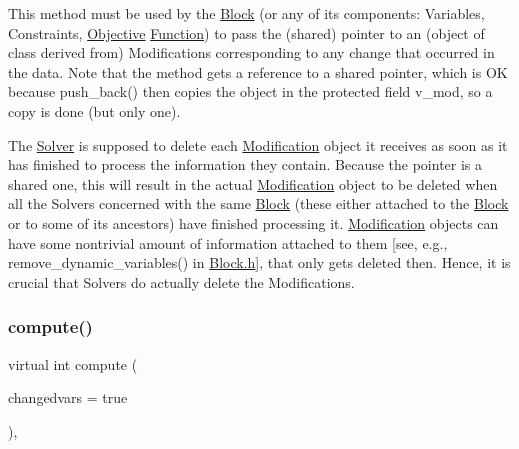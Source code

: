 This method must be used by the \mbox{\hyperlink{class_s_m_spp__di__unipi__it_1_1_block}{Block}} (or any of its components\+: Variables, Constraints, \mbox{\hyperlink{class_s_m_spp__di__unipi__it_1_1_objective}{Objective}} \mbox{\hyperlink{class_s_m_spp__di__unipi__it_1_1_function}{Function}}) to pass the (shared) pointer to an (object of class derived from) Modifications corresponding to any change that occurred in the data. Note that the method gets a reference to a shared pointer, which is OK because push\+\_\+back() then copies the object in the protected field v\+\_\+mod, so a copy is done (but only one).

The \mbox{\hyperlink{class_s_m_spp__di__unipi__it_1_1_solver}{Solver}} is supposed to delete each \mbox{\hyperlink{class_s_m_spp__di__unipi__it_1_1_modification}{Modification}} object it receives as soon as it has finished to process the information they contain. Because the pointer is a shared one, this will result in the actual \mbox{\hyperlink{class_s_m_spp__di__unipi__it_1_1_modification}{Modification}} object to be deleted when all the Solvers concerned with the same \mbox{\hyperlink{class_s_m_spp__di__unipi__it_1_1_block}{Block}} (these either attached to the \mbox{\hyperlink{class_s_m_spp__di__unipi__it_1_1_block}{Block}} or to some of its ancestors) have finished processing it. \mbox{\hyperlink{class_s_m_spp__di__unipi__it_1_1_modification}{Modification}} objects can have some nontrivial amount of information attached to them \mbox{[}see, e.\+g., remove\+\_\+dynamic\+\_\+variables() in \mbox{\hyperlink{_block_8h}{Block.\+h}}\mbox{]}, that only gets deleted then. Hence, it is crucial that Solvers do actually delete the Modifications. \mbox{\label{class_s_m_spp__di__unipi__it_1_1_solver_a504d4e3e174c7a518cc66156a8a45ce5}} 
\subsubsection{\texorpdfstring{compute()}{compute()}}
{\footnotesize\ttfamily virtual int compute (\begin{DoxyParamCaption}\item[{bool}]{changedvars = {\ttfamily true} }\end{DoxyParamCaption})\hspace{0.3cm}{\ttfamily [override]}, {}}



